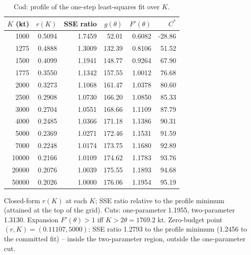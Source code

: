 \documentclass[11pt,a4paper]{article}
\begin{document}
\begin{table}[H]
\centering
\caption{Cod: profile of the one-step least-squares fit over $K$.}
\label{tab:si-profile}
\small
\begin{tabular}{rrrrrr}
\toprule
$K$ (kt) & $r(K)$ & SSE ratio & $g(\theta)$ & $F'(\theta)$ & $C^*$ \\
\midrule
1000 & 0.5094 & 1.7459 & 52.01 & 0.6082 & -28.86 \\
1275 & 0.4888 & 1.3009 & 132.39 & 0.8106 & 51.52 \\
1500 & 0.4099 & 1.1941 & 148.77 & 0.9264 & 67.90 \\
1775 & 0.3550 & 1.1342 & 157.55 & 1.0012 & 76.68 \\
2000 & 0.3273 & 1.1068 & 161.47 & 1.0378 & 80.60 \\
2500 & 0.2908 & 1.0730 & 166.20 & 1.0850 & 85.33 \\
3000 & 0.2704 & 1.0551 & 168.66 & 1.1109 & 87.79 \\
4000 & 0.2485 & 1.0366 & 171.18 & 1.1386 & 90.31 \\
5000 & 0.2369 & 1.0271 & 172.46 & 1.1531 & 91.59 \\
7000 & 0.2248 & 1.0174 & 173.75 & 1.1680 & 92.89 \\
10000 & 0.2166 & 1.0109 & 174.62 & 1.1783 & 93.76 \\
20000 & 0.2076 & 1.0039 & 175.55 & 1.1893 & 94.68 \\
50000 & 0.2026 & 1.0000 & 176.06 & 1.1954 & 95.19 \\
\bottomrule
\end{tabular}
\par\smallskip\begin{minipage}{0.97\linewidth}\footnotesize Closed-form $r(K)$ at each $K$; SSE ratio relative to the profile minimum (attained at the top of the grid). Cuts: one-parameter 1.1955, two-parameter 1.3130. Expansion $F'(\theta)>1$ iff $K>2\theta=1769.2$ kt. Zero-budget point $(r,K)=(0.11107,5000)$: SSE ratio 1.2793 to the profile minimum (1.2456 to the committed fit) -- inside the two-parameter region, outside the one-parameter cut.\end{minipage}
\end{table}
\end{document}
